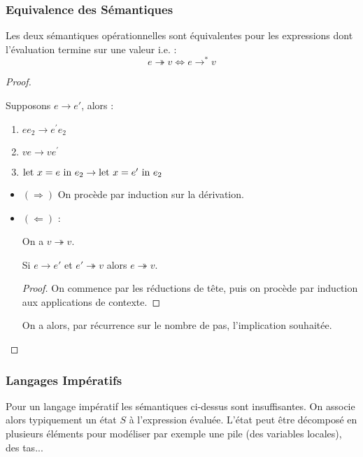 \documentclass{cours}
\newcommand*{\rrarrow}{\twoheadrightarrow}
\newcommand*{\letin}[1]{\textmd{let } #1 \textmd{ in }}
\begin{document}
\subsubsection{Equivalence des Sémantiques}
\begin{theorem}
    Les deux sémantiques opérationnelles sont équivalentes pour les expressions dont l'évaluation termine sur une valeur i.e. :
    \[
        e \rrarrow v \Leftrightarrow e \rightarrow^{*} v    
    \]    
\end{theorem}
\begin{proof}
    \begin{lemma}
        Supposons $e \rightarrow e'$, alors :        
        \begin{enumerate}
            \item $e e_{2} \rightarrow e^{'} e_{2}$
            \item $v e \rightarrow v e^{'}$
            \item $\letin{x = e} e_{2} \rightarrow \letin{x = e'} e_{2}$
        \end{enumerate}
    \end{lemma}
    \begin{itemize}
        \item $(\Rightarrow)$ On procède par induction sur la dérivation. 
        \item $(\Leftarrow)$ :
        \begin{lemma}
           On a $v \rrarrow v$.
        \end{lemma}
        \begin{lemma}
            Si $e \rightarrow e'$ et $e' \rrarrow v$ alors $e \rrarrow v$.
        \end{lemma}
        \begin{proof}
            On commence par les réductions de tête, puis on procède par induction aux applications de contexte. 
        \end{proof}
        On a alors, par récurrence sur le nombre de pas, l'implication souhaitée. 
    \end{itemize}
\end{proof}

\subsubsection{Langages Impératifs}
Pour un langage impératif les sémantiques ci-dessus sont insuffisantes. On associe alors typiquement un état $S$ à l'expression évaluée. L'état peut être décomposé en plusieurs éléments pour modéliser par exemple une pile (des variables locales), des tas... 
\end{document}
